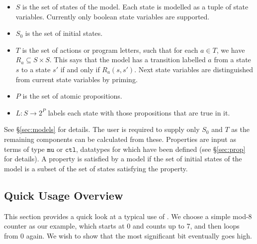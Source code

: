 \begin{itemize}
\item \( S \) is the set of states of the model. Each state is modelled as a tuple of state variables. Currently only boolean state variables are supported.
\item \( S_0\) is the set of initial states.
\item \( T \) is the set of actions or program letters, such that for each \( a \in T \), we have \( R_a \subseteq S \times S\). This says that the model has a transition labelled \( a \) from a state \( s \) to a state \( s' \) if and only if \( R_a(s,s') \). Next state variables are distinguished from current state variables by priming.
\item \( P \) is the set of atomic propositions.
\item \( L:S\rightarrow 2^P \) labels each state with those propositions that are true in it.
\end{itemize}

See \S\ref{sec:models} for details. The user is required to supply only \( S_0 \) and \( T \) as the remaining components can be calculated from these. Properties are input as \HOL{} terms of type \(\mathtt{mu}\) or \(\mathtt{ctl}\), \HOL{} datatypes for which have been defined (see \S\ref{sec:prop} for details). A property is satisfied by a model if the set of initial states of the model is a subset of the set of states satisfying the property.

\subsection{Quick Usage Overview}

This section provides a quick look at a typical use of \hc{}. We choose a simple mod-8 counter as our example, which starts at 0 and counts up to 7, and then loops from 0 again. We wish to show that the most significant bit eventually goes high.

